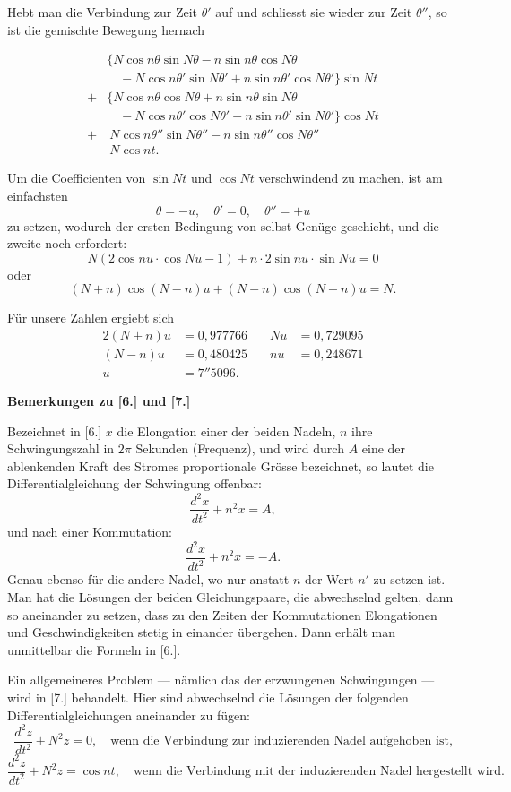 \documentclass[12pt,a4paper]{article}
\begin{document}
Hebt man die Verbindung zur Zeit $\theta'$ auf und schliesst sie wieder zur Zeit $\theta''$, so ist die gemischte Bewegung hernach

\begin{align*}
&\bigl\{N\cos n\theta \sin N\theta - n\sin n\theta \cos N\theta \\
&\quad - N\cos n\theta' \sin N\theta' + n\sin n\theta' \cos N\theta'\bigr\} \sin Nt \\
+&\bigl\{N\cos n\theta \cos N\theta + n\sin n\theta \sin N\theta \\
&\quad - N\cos n\theta' \cos N\theta' - n\sin n\theta' \sin N\theta'\bigr\} \cos Nt \\
+&\ N\cos n\theta'' \sin N\theta'' - n\sin n\theta'' \cos N\theta'' \\
-&\ N\cos nt.
\end{align*}

Um die Coefficienten von $\sin Nt$ und $\cos Nt$ verschwindend zu machen, ist am einfachsten
\[
\theta = -u, \quad \theta' = 0, \quad \theta'' = +u
\]
zu setzen, wodurch der ersten Bedingung von selbst Gen\"uge geschieht, und die zweite noch erfordert:
\[
N(2\cos nu \cdot \cos Nu - 1) + n \cdot 2\sin nu \cdot \sin Nu = 0
\]
oder
\[
(N+n)\cos(N-n)u + (N-n)\cos(N+n)u = N.
\]

F\"ur unsere Zahlen ergiebt sich
\begin{alignat*}{2}
(N+n)u &= 0{,}977766 \quad & Nu &= 0{,}729095 \\
(N-n)u &= 0{,}480425 \quad & nu &= 0{,}248671 \\
u &= 7''5096.
\end{alignat*}

\medskip\noindent
\textbf{Bemerkungen zu [6.] und [7.]}

Bezeichnet in [6.] $x$ die Elongation einer der beiden Nadeln, $n$ ihre Schwingungszahl in $2\pi$ Sekunden (Frequenz), und wird durch $A$ eine der ablenkenden Kraft des Stromes proportionale Gr\"osse bezeichnet, so lautet die Differentialgleichung der Schwingung offenbar:
\[
\frac{d^2x}{dt^2} + n^2 x = A,
\]
und nach einer Kommutation:
\[
\frac{d^2x}{dt^2} + n^2 x = -A.
\]
Genau ebenso f\"ur die andere Nadel, wo nur anstatt $n$ der Wert $n'$ zu setzen ist. Man hat die L\"osungen der beiden Gleichungspaare, die abwechselnd gelten, dann so aneinander zu setzen, dass zu den Zeiten der Kommutationen Elongationen und Geschwindigkeiten stetig in einander \"ubergehen. Dann erh\"alt man unmittelbar die Formeln in [6.].

Ein allgemeineres Problem --- n\"amlich das der erzwungenen Schwingungen --- wird in [7.] behandelt. Hier sind abwechselnd die L\"osungen der folgenden Differentialgleichungen aneinander zu f\"ugen:
\[
\frac{d^2z}{dt^2} + N^2 z = 0, \quad \text{wenn die Verbindung zur induzierenden Nadel aufgehoben ist,}
\]
\[
\frac{d^2z}{dt^2} + N^2 z = \cos nt, \quad \text{wenn die Verbindung mit der induzierenden Nadel hergestellt wird.}
\]
\end{document}
